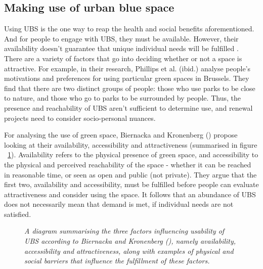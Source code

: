 \documentclass{article}
\begin{document}
\subsection{Making use of urban blue space}

Using UBS is the one way to reap the health and social benefits aforementioned. And for people to engage with UBS, they must be available. However, their availability doesn't guarantee that unique individual needs will be fulfilled \parencite{phillips2021use}. There are a variety of factors that go into deciding whether or not a space is attractive. For example, in their research, Phillips et al. (ibid.) analyse people's motivations and preferences for using particular green spaces in Brussels. They find that there are two distinct groups of people: those who use parks to be close to nature, and those who go to parks to be surrounded by people. Thus, the presence and reachability of UBS aren't sufficient to determine use, and renewal projects need to consider socio-personal nuances.

For analysing the use of green space, Biernacka and Kronenberg (\citeyear{biernacka2018classification}) propose looking at their availability, accessibility and attractiveness (summarised in figure ~\ref{fig:diagram_ubs_use}).
Availability refers to the physical presence of green space, and accessibility to the physical and perceived reachability of the space - whether it can be reached in reasonable time, or seen as open and public (not private). 
They argue that the first two, availability and accessibility, must be fulfilled before people can evaluate attractiveness and consider using the space. 
It follows that an abundance of UBS does not necessarily mean that demand is met, if individual needs are not satisfied.

\begin{figure}[h]
	\caption{\textit{A diagram summarising the three factors influencing usability of UBS according to Biernacka and Kronenberg (\citeyear{biernacka2018classification}), namely availability, accessibility and attractiveness, along with examples of physical and social barriers that influence the fulfillment of these factors.}}
	  \label{fig:diagram_ubs_use}
\end{figure}
\end{document}
